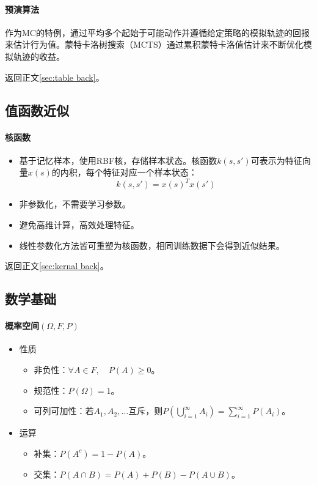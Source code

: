 \documentclass[
12pt, %
a4paper, 
oneside, %
]{scrartcl}
\begin{document}
{\paragraph{预演算法}
作为MC的特例，通过平均多个起始于可能动作并遵循给定策略的模拟轨迹的回报来估计行为值。蒙特卡洛树搜索（MCTS）通过累积蒙特卡洛值估计来不断优化模拟轨迹的收益。

返回正文\ref{sec:table back}。
\subsection[值函数近似]{值函数近似}
\paragraph[核函数]{核函数}\label{sec:kernal}
\begin{itemize}
\item 基于记忆样本，使用RBF核，存储样本状态。核函数$ k(s, s') $可表示为特征向量$ x(s) $的内积，每个特征对应一个样本状态：
$$ k(s, s') = x(s)^T x(s') $$
\item 非参数化，不需要学习参数。
\item 避免高维计算，高效处理特征。
\item 线性参数化方法皆可重塑为核函数，相同训练数据下会得到近似结果。
\end{itemize}

返回正文\ref{sec:kernal back}。
\subsection[数学基础]{数学基础}
\paragraph{概率空间$ (\Omega, F, P) $}
\begin{itemize}
\item 性质
\begin{itemize}
\item 非负性：$ \forall A \in F, \quad P(A) \geq 0 $。
\item 规范性：$ P(\Omega) = 1 $。
\item 可列可加性：若$ A_1, A_2, \dots $互斥，则$ P(\bigcup_{i = 1}^{\infty} A_i) = \sum_{i = 1}^{\infty} P(A_i) $。
\end{itemize}
\item 运算
\begin{itemize}
\item 补集：$ P(A^c) = 1 - P(A) $。
\item 交集：$ P(A \cap B) = P(A) + P(B) - P(A \cup B) $。
\end{itemize}
\end{itemize}
}
\end{document}
